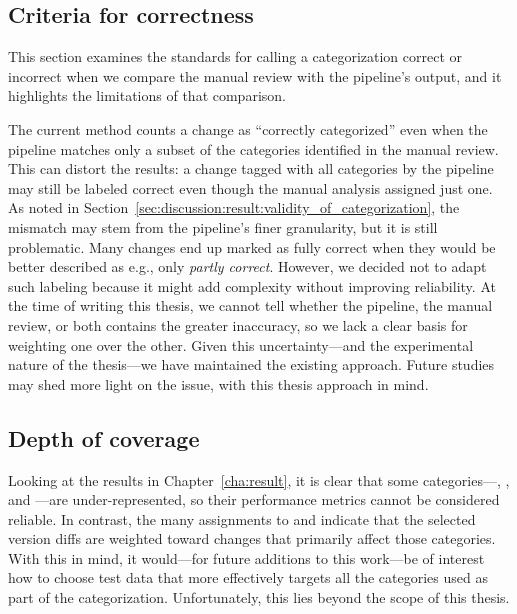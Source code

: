 \subsection{Criteria for correctness}
This section examines the standards for calling a categorization correct or incorrect when we compare the manual review with the pipeline’s output, and it highlights the limitations of that comparison.

The current method counts a change as “correctly categorized” even when the pipeline matches only a subset of the categories identified in the manual review. This can distort the results: a change tagged with all categories by the pipeline may still be labeled correct even though the manual analysis assigned just one. As noted in Section~\ref{sec:discussion:result:validity_of_categorization}, the mismatch may stem from the pipeline’s finer granularity, but it is still problematic. Many changes end up marked as fully correct when they would be better described as e.g., only \textit{partly correct}. However, we decided not to adapt such labeling because it might add complexity without improving reliability. At the time of writing this thesis, we cannot tell whether the pipeline, the manual review, or both contains the greater inaccuracy, so we lack a clear basis for weighting one over the other. Given this uncertainty—and the experimental nature of the thesis—we have maintained the existing approach. Future studies may shed more light on the issue, with this thesis approach in mind.



\subsection{Depth of coverage}
Looking at the results in Chapter~\ref{cha:result}, it is clear that some categories—, , and —are under-represented, so their performance metrics cannot be considered reliable. In contrast, the many assignments to  and  indicate that the selected version diffs are weighted toward changes that primarily affect those categories. With this in mind, it would—for future additions to this work—be of interest how to choose test data that more effectively targets all the categories used as part of the categorization. Unfortunately, this lies beyond the scope of this thesis.






